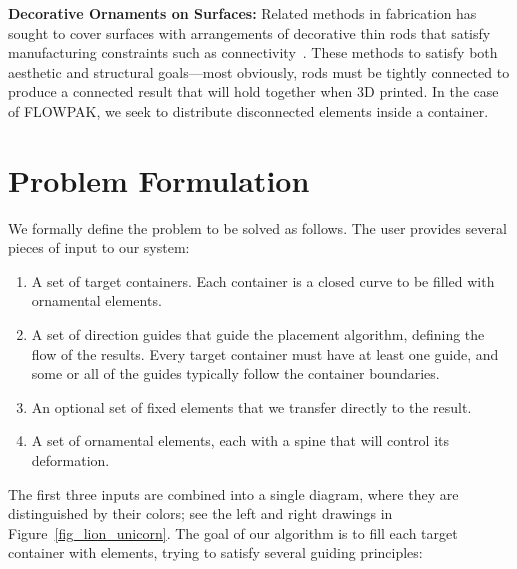 \newtext
{
\textbf{Decorative Ornaments on Surfaces:} 
Related methods in fabrication has sought to cover surfaces with
arrangements of decorative thin rods that satisfy manufacturing
constraints such as connectivity~\cite{Chen2016, Zehnder2016, Bian2018, Martinez2019}.
These methods to satisfy both aesthetic and structural
goals---most obviously, rods must be tightly connected to produce a connected result
that will hold together when 3D printed.
In the case of FLOWPAK, we seek to distribute disconnected elements inside a container.
}


\section{Problem Formulation}
\label{flowpak_problem_formulation}

We formally define the problem to be solved as follows.  The user provides several pieces of input
to our system:
\begin{enumerate}
      \item A set of target containers.
            Each container 
			is a closed curve to be filled with ornamental elements.
      \item A set of direction guides
      		that guide the placement algorithm, defining the flow of the results. 
      		Every target container must have at least one guide, and some or
      		all of the guides typically follow the container boundaries.
      \item An optional set of fixed elements that we transfer directly to the result.
      \item A set of ornamental elements, each with a spine that will control
            its deformation.
\end{enumerate}

The first three inputs are combined into a single diagram, where they are
distinguished by their colors; see
the left and right drawings in Figure~\ref{fig_lion_unicorn}.
The goal of our algorithm is to fill each target container with elements,
trying to satisfy several guiding principles:

